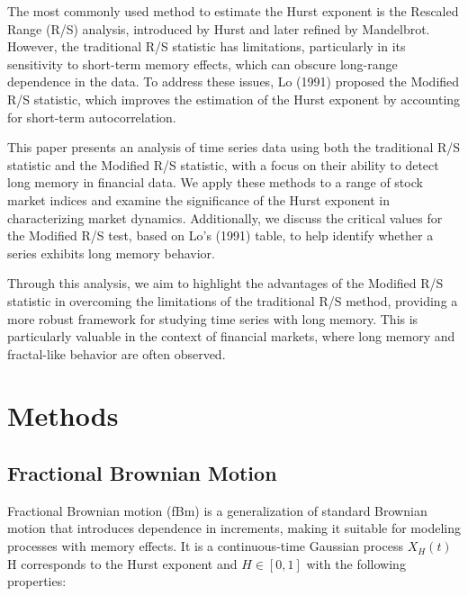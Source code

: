 \documentclass[11pt]{extarticle}
\begin{document}
The most commonly used method to estimate the Hurst exponent is the Rescaled Range (R/S) analysis, introduced by Hurst and later refined by Mandelbrot. However, the traditional R/S statistic has limitations, particularly in its sensitivity to short-term memory effects, which can obscure long-range dependence in the data. To address these issues, Lo (1991) proposed the Modified R/S statistic, which improves the estimation of the Hurst exponent by accounting for short-term autocorrelation.

This paper presents an analysis of time series data using both the traditional R/S statistic and the Modified R/S statistic, with a focus on their ability to detect long memory in financial data. We apply these methods to a range of stock market indices and examine the significance of the Hurst exponent in characterizing market dynamics. Additionally, we discuss the critical values for the Modified R/S test, based on Lo’s (1991) table, to help identify whether a series exhibits long memory behavior.

Through this analysis, we aim to highlight the advantages of the Modified R/S statistic in overcoming the limitations of the traditional R/S method, providing a more robust framework for studying time series with long memory. This is particularly valuable in the context of financial markets, where long memory and fractal-like behavior are often observed.



\section{Methods}

\subsection{Fractional Brownian Motion}

Fractional Brownian motion (fBm) is a generalization of standard Brownian motion that introduces dependence in increments,
making it suitable for modeling processes with memory effects. It is a continuous-time Gaussian process \( X_H(t) \) H corresponds
to the Hurst exponent and \( H \in [0, 1] \) with the following properties:
\end{document}
